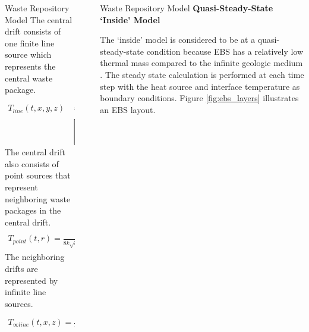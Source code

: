 \documentclass[final]{beamer}
\newlength{\sepwid}
\newlength{\onecolwid}
\newlength{\threecolwid}
\begin{document}
\begin{frame}[t]
\begin{columns}[t,totalwidth=\threecolwid]
\begin{column}{\onecolwid}
\begin{block}{Waste Repository Model}
The central drift consists of one finite line source which represents the central 
waste package.
\begin{align*}
	T_{line}(t,x,y,z) &= \frac{1}{8 \pi k}  \int _{0}^{t} \frac{q_L(t')}{t-t'}e^{\frac{-(x^2+z^2)}{4\alpha(t-t')}} \\
	&[erf[\frac{1}{2}\frac{y+L/2}{\sqrt{\alpha(t-t')}}]-erf[\frac{1}{2}\frac{y-L/2}{\sqrt{\alpha(t-t')}}]] dt'
\end{align*}
The central drift also consists of point sources that represent neighboring 
waste packages in the central drift. 
\begin{align*}
	T_{point}(t,r) = \frac{1}{8 k \sqrt{\alpha} \pi^{3/2}} \int_{0}^{t}\frac{q(t')}{(t-t')^{3/2}}e^{\frac{-r^2}{4\alpha(t-t')}}dt'
\end{align*}
The neighboring drifts are represented by infinite line sources.  
\begin{align*}
	T_{\infty line}(t,x,z) = \frac{1}{4\pi k} \int_0^t \frac{q_L(t')}{t-t'} e^{\frac{-(x^2+z^2)}{4\alpha (t-t')}} dt'
\end{align*}

\end{block}



\end{column} %

\begin{column}{\sepwid}\end{column} %

\begin{column}{\onecolwid} %

\begin{block}{Waste Repository Model}
\textbf{Quasi-Steady-State `Inside' Model}

The `inside' model is considered to be at a quasi-steady-state condition because \gls{EBS}
has a relatively low thermal mass compared to the infinite geologic medium 
\cite{sutton_investigations_2011}. 
The steady state calculation is performed at each time step with the heat source and 
interface temperature as boundary conditions. 
Figure \ref{fig:ebs_layers} illustrates an \gls{EBS} layout.


\end{block}
\end{column}
\end{columns}
\end{frame}
\end{document}

